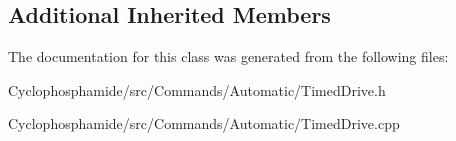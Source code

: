 \subsection*{Additional Inherited Members}


The documentation for this class was generated from the following files\+:\begin{DoxyCompactItemize}
\item 
Cyclophosphamide/src/\+Commands/\+Automatic/Timed\+Drive.\+h\item 
Cyclophosphamide/src/\+Commands/\+Automatic/Timed\+Drive.\+cpp\end{DoxyCompactItemize}
